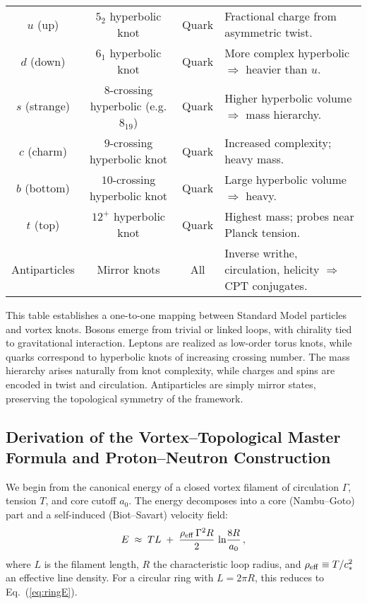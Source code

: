 \documentclass[12pt]{article}
\begin{document}
\begin{table}[h]
\begin{tabular}{|c|c|c|p{7.5cm}|}
\hline
$u$ (up) & $5_2$ hyperbolic knot & Quark & Fractional charge from asymmetric twist. \\
$d$ (down) & $6_1$ hyperbolic knot & Quark & More complex hyperbolic $\Rightarrow$ heavier than $u$. \\
$s$ (strange) & $8$-crossing hyperbolic (e.g. $8_{19}$) & Quark & Higher hyperbolic volume $\Rightarrow$ mass hierarchy. \\
$c$ (charm) & $9$-crossing hyperbolic knot & Quark & Increased complexity; heavy mass. \\
$b$ (bottom) & $10$-crossing hyperbolic knot & Quark & Large hyperbolic volume $\Rightarrow$ heavy. \\
$t$ (top) & $12^+$ hyperbolic knot & Quark & Highest mass; probes near Planck tension. \\
\hline
Antiparticles & Mirror knots & All & Inverse writhe, circulation, helicity $\Rightarrow$ CPT conjugates. \\
\hline
\end{tabular}
\end{table}

This table establishes a one-to-one mapping between Standard Model particles and vortex knots.
Bosons emerge from trivial or linked loops, with chirality tied to gravitational interaction.
Leptons are realized as low-order torus knots, while quarks correspond to hyperbolic knots of increasing crossing number.
The mass hierarchy arises naturally from knot complexity, while charges and spins are encoded in twist and circulation.
Antiparticles are simply mirror states, preserving the topological symmetry of the framework.

\subsection{Derivation of the Vortex--Topological Master Formula and Proton--Neutron Construction}

We begin from the canonical energy of a closed vortex filament of circulation $\Gamma$, tension $T$, and core cutoff $a_0$. The energy decomposes into a core (Nambu–Goto) part and a self-induced (Biot–Savart) velocity field:
\begin{equation}
E \;\approx\; T L \;+\; \frac{\rho_{\rm eff}\,\Gamma^2 R}{2}\,\ln\!\frac{8R}{a_0}\,,
\label{eq:ringE}
\end{equation}
where $L$ is the filament length, $R$ the characteristic loop radius, and $\rho_{\rm eff}\equiv T/c_*^2$ an effective line density. For a circular ring with $L=2\pi R$, this reduces to Eq.~(\ref{eq:ringE}).
\end{document}
